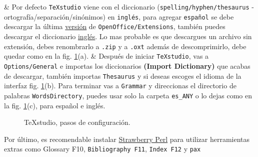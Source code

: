 \Activate
\begin{easylist}[itemize]
	& Por defecto \verb|TeXstudio| viene con el diccionario (\verb|spelling/hyphen/thesaurus| - ortografía/separación/sinónimos) en \verb|inglés|, para agregar \verb|español| se debe descargar la última \href{http://extensions.openoffice.org/de/project/spanish-espanol}{versión} de \verb|OpenOffice/Extensions|, también puedes descargar el diccionario  \href{http://extensions.openoffice.org/de/project/english-dictionaries-apache-openoffice}{inglés}. Lo mas probable es que descargues un archivo sin extensión, debes renombrarlo a \verb|.zip| y a \verb|.oxt| además de descomprimirlo, debe quedar como en la fig. \ref{fig:TeXstudio}(a).	
	& Después de iniciar \verb|TeXstudio|, vas a \verb|Options/General| e importas los diccionarios \textbf{(Import Dictionary)} que acabas de descargar, también importas \verb|Thesaurus| y si deseas escoges el idioma de la interfaz fig. \ref{fig:TeXstudio}(b). Para terminar vas a \verb|Grammar| y direccionas el directorio de palabras \verb|WordsDirectory|, puedes usar solo la carpeta \verb|es_ANY| o lo dejas como en la fig. \ref{fig:TeXstudio}(c), para español e inglés.
\end{easylist}
\Deactivate

\begin{figure}[H]
	\centering
	\caption{TeXstudio, pasos de configuración.}
	\label{fig:TeXstudio}
\end{figure}

		
Por último, es recomendable instalar \href{http://www.perl.org/get.html}{Strawberry Perl} para utilizar herramientas extras como \textsf{Glossary F10}, \verb|Bibliography F11|, \verb|Index F12| y \verb|pax|

